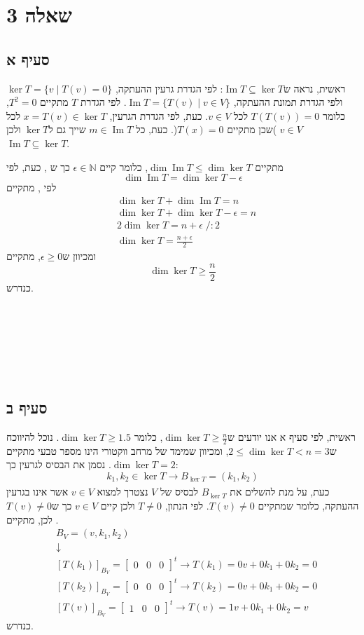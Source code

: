 \documentclass[11pt, oneside]{article}
\newcommand{\qed}{\R{$\blacksquare$}}
\newcommand{\br}{\\\\\\\\\\\\\\}
\newcommand{\opr}[1]{\xrightarrow[\text{#1}]{}}
\newcommand{\mN}{\mathbb{N}}
\newcommand{\m}[3]{\R{משפט #3#2.#1}}
\DeclareMathOperator{\Ima}{Im}
\newcommand{\tir}[3]{\begin{bmatrix}#1 & #2 & #3\end{bmatrix}}
\begin{document}
\section{שאלה 3}
\subsection{סעיף א}
ראשית, נראה ש$\Ima{T} \subseteq \ker{T}$: לפי הגדרת גרעין ההעתקה, $\ker{T} = \{v \mid T(v) = 0\}$ ולפי הגדרת תמונת ההעתקה, $\Ima{T} = \{T(v) \mid v \in V\}$. לפי הגדרת $T$ מתקיים $T^2 = 0$, כלומר $T(T(v)) = 0$ לכל $v \in V$. כעת, לפי הגדרת הגרעין, $x = T(v) \in \ker{T}$ לכל $v \in V$ )שכן מתקיים $T(x) = 0$(. כעת, כל $m \in \Ima{T}$ שייך גם ל$\ker{T}$ ולכן $\Ima{T} \subseteq \ker{T}$.

כעת, לפי \m{8}{3}{4.},‎ מתקיים $\dim{\Ima{T}} \le \dim{\ker{T}}$, כלומר קיים $\epsilon \in \mN$ כך ש
\[
\dim{\Ima{T}} = \dim{\ker{T}} -‎ \epsilon
\]
לפי \m{9}{6}{1.}, מתקיים
\begin{align*}
& \dim{\ker{T}} + \dim{\Ima{T}} = n\\
& \dim{\ker{T}} + \dim{\ker{T}} - \epsilon = n\\
& 2\dim{\ker{T}} = n + \epsilon\;/:2\\
& \dim{\ker{T}} = \frac{n + \epsilon}{2}
\end{align*}
ומכיוון ש$\epsilon \ge 0$, מתקיים
\[
\dim{\ker{T}} \ge \frac{n}{2}
\]
כנדרש.
\br\qed

\subsection{סעיף ב}
ראשית, לפי סעיף א אנו יודעים ש$\dim{\ker{T}} \ge \frac{n}{2}$, כלומר $\dim{\ker{T}} \ge 1.5$. נוכל להיווכח ש$2 \le \dim{\ker{T}} < n = 3$, ומכיוון שמימד של מרחב ווקטורי הינו מספר טבעי מתקיים $\dim{\ker{T}} = 2$. נסמן את הבסיס לגרעין כך:
\[
k_1, k_2 \in \ker{T} \opr{} B_{\ker{T}} = (k_1, k_2)
\]
כעת, על מנת להשלים את $B_{\ker{T}}$ לבסיס של $V$ נצטרך למצוא $v \in V$ אשר אינו בגרעין ההעתקה, כלומר שמתקיים $T(v) \neq 0$. לפי הנתון, $T \neq 0$ ולכן קיים $v \in V$ כך ש$T(v) \neq 0$. לכן, מתקיים
\begin{eqnarray*}
& B_V = (v, k_1, k_2)\\
& \downarrow\\
& [T(k_1)]_{B_V} = \tir{0}{0}{0}^t \opr{} T(k_1) = 0v + 0k_1 + 0k_2 = 0\\
& [T(k_2)]_{B_V} = \tir{0}{0}{0}^t \opr{} T(k_2) = 0v + 0k_1 + 0k_2 = 0\\
& [T(v)]_{B_V} = \tir{1}{0}{0}^t \opr{} T(v) = 1v + 0k_1 + 0k_2 = v
\end{eqnarray*}
כנדרש.
\br\qed
\end{document}
